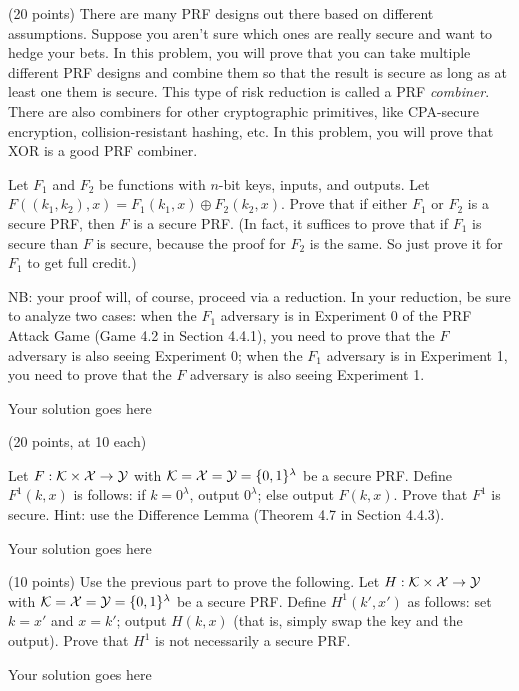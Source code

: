 \documentclass[12pt]{article}
\begin{document}
\begin{problem} (20 points)
There are many PRF designs out there based on different assumptions. Suppose you aren't sure which ones are really secure and want to hedge your bets. In this problem, you will prove that you can take multiple different PRF designs and combine them  so that the result is secure as long as at least one them is secure. This type of risk reduction is called a PRF \emph{combiner}.  There are also combiners for other cryptographic primitives, like CPA-secure encryption, collision-resistant hashing, etc. In this problem, you will prove that XOR is a good PRF combiner.

Let $F_1$ and $F_2$ be functions with $n$-bit keys, inputs, and outputs. Let $F((k_1, k_2), x) = F_1(k_1, x)\oplus F_2(k_2, x)$. Prove that if either $F_1$ or $F_2$ is a secure PRF, then $F$ is a secure PRF.  (In fact, it suffices to prove that if $F_1$ is secure than $F$ is secure, because the proof for $F_2$ is the same. So just prove it for $F_1$ to get full credit.)

NB: your proof will, of course, proceed via a reduction. In your reduction, be sure to analyze two cases: when the $F_1$ adversary is in Experiment 0 of the PRF Attack Game (Game 4.2 in Section 4.4.1), you need to prove that the $F$ adversary is also seeing Experiment 0; when the $F_1$ adversary is in Experiment 1, you need to prove that the $F$ adversary is also seeing Experiment 1.
 \end{problem}

\begin{solution}
Your solution goes here
\end{solution}



\begin{problem} (20 points, at 10 each)

\begin{ppart}
  Let $F:\mathcal{K}\times \mathcal{X} \rightarrow \mathcal{Y}$ with $\mathcal{K}=\mathcal{X}=\mathcal{Y}=\{0,1\}^\lambda$ be a secure PRF. Define $F^1(k, x)$ is follows: if $k=0^\lambda$, output $0^\lambda$; else output $F(k, x)$. Prove that $F^1$ is secure. Hint: use the Difference Lemma (Theorem 4.7 in Section 4.4.3).
\end{ppart}

\begin{solution}
Your solution goes here
\end{solution}


 \begin{ppart} (10 points)
Use the previous part to prove the following.  Let $H:\mathcal{K}\times \mathcal{X} \rightarrow \mathcal{Y}$ with $\mathcal{K}=\mathcal{X}=\mathcal{Y}=\{0,1\}^\lambda$ be a secure PRF. Define $H^1(k', x')$ as follows: set $k=x'$ and  $x=k'$; output $H(k, x)$ (that is, simply swap the key and the output). Prove that $H^1$ is not necessarily a secure PRF.
 
 \end{ppart}
\begin{solution}
Your solution goes here
\end{solution}
 
\end{problem} 
 
\end{document}
